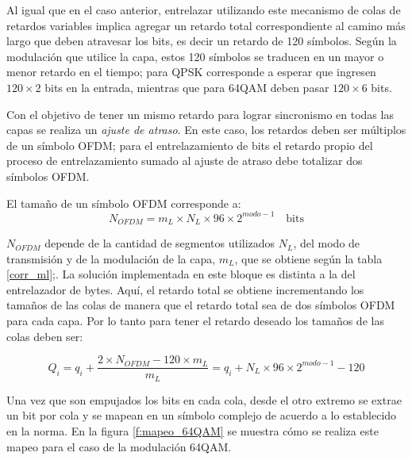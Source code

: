 Al igual que en el caso anterior, entrelazar utilizando este mecanismo de colas de retardos variables implica agregar un retardo total correspondiente al camino más largo que deben atravesar los bits, es decir un retardo de 120 símbolos. Según la modulación que utilice la capa, estos 120 símbolos se traducen en un mayor o menor retardo en el tiempo; para QPSK corresponde a esperar que ingresen $120 \times 2$ bits en la entrada, mientras que para 64QAM deben pasar $120 \times 6$ bits.

Con el objetivo de tener un mismo retardo para lograr sincronismo en todas las capas se realiza un \textit{ajuste de atraso}. En este caso, los retardos deben ser m\'ultiplos de un s\'imbolo OFDM; para el entrelazamiento de bits el retardo propio del proceso de entrelazamiento sumado al ajuste de atraso debe totalizar dos s\'imbolos OFDM.

El tamaño de un s\'imbolo OFDM corresponde a: 
\begin{equation}
N_{OFDM} = m_L \times N_L \times 96 \times 2^{modo-1} \quad \text{bits}
\end{equation}

$N_{OFDM}$ depende de la cantidad de segmentos utilizados $N_L$, del modo de transmisi\'on y de la modulaci\'on de la capa, $m_L$, que se obtiene según la tabla \ref{corr_ml};. La soluci\'on implementada en este bloque es distinta a la del entrelazador de bytes. Aquí, el retardo total se obtiene incrementando los tamaños de las colas de manera que el retardo total sea de dos s\'imbolos OFDM para cada capa. Por lo tanto para tener el retardo deseado los tamaños de las colas deben ser:

\begin{equation}
Q_i = q_i + \dfrac{2 \times N_{OFDM} - 120 \times m_L}{m_L} = q_i + N_L \times 96 \times 2^{modo-1} - 120
\end{equation}

Una vez que son empujados los bits en cada cola, desde el otro extremo se extrae un bit por cola y se mapean en un s\'imbolo complejo de acuerdo a lo establecido en la norma. En la figura \ref{f:mapeo_64QAM} se muestra c\'omo se realiza este mapeo para el caso de la modulaci\'on 64QAM. 

